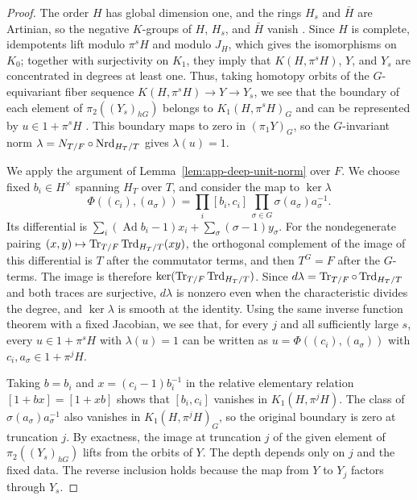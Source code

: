 \begin{proof}
The order $H$ has global dimension one, and the rings $H_s$ and $\bar H$ are Artinian, so the negative $K$-groups of $H$, $H_s$, and $\bar H$ vanish \cite[III, \S4 and Exercise 4.3]{WeibelKbook}.
Since $H$ is complete, idempotents lift modulo $\pi^sH$ and modulo $J_H$, which gives the isomorphisms on $K_0$; together with surjectivity on $K_1$, they imply that $K(H,\pi^sH)$, $Y$, and $Y_s$ are concentrated in degrees at least one.
Thus, taking homotopy orbits of the $G$-equivariant fiber sequence $K(H,\pi^sH)\to Y\to Y_s$, we see that the boundary of each element of $\pi_2((Y_s)_{hG})$ belongs to $K_1(H,\pi^sH)_G$ and can be represented by $u\in1+\pi^sH$ \cite[III, Lemma 2.4(1)]{WeibelKbook}.
This boundary maps to zero in $(\pi_1Y)_G$, so the $G$-invariant norm $\lambda=N_{T/F}\circ\operatorname{Nrd}_{H_T/T}$ gives $\lambda(u)=1$.

We apply the argument of Lemma~\ref{lem:app-deep-unit-norm} over $F$.
We choose fixed $b_i\in H^\times$ spanning $H_T$ over $T$, and consider the map to $\ker\lambda$
\[
 \Phi((c_i),(a_\sigma))=\prod_i[b_i,c_i]\,
                   \prod_{\sigma\in G}\sigma(a_\sigma)a_\sigma^{-1}.
\]
Its differential is $\sum_i(\operatorname{Ad}b_i-1)x_i+\sum_\sigma(\sigma-1)y_\sigma$.
For the nondegenerate pairing $(x,y)\mapsto\operatorname{Tr}_{T/F}\operatorname{Trd}_{H_T/T}(xy)$, the orthogonal complement of the image of this differential is $T$ after the commutator terms, and then $T^G=F$ after the $G$-terms.
The image is therefore $\ker(\operatorname{Tr}_{T/F}\operatorname{Trd}_{H_T/T})$.
Since $d\lambda=\operatorname{Tr}_{T/F}\circ\operatorname{Trd}_{H_T/T}$ and both traces are surjective, $d\lambda$ is nonzero even when the characteristic divides the degree, and $\ker\lambda$ is smooth at the identity.
Using the same inverse function theorem with a fixed Jacobian, we see that, for every $j$ and all sufficiently large $s$, every $u\in1+\pi^sH$ with $\lambda(u)=1$ can be written as $u=\Phi((c_i),(a_\sigma))$ with $c_i,a_\sigma\in1+\pi^jH$.

Taking $b=b_i$ and $x=(c_i-1)b_i^{-1}$ in the relative elementary relation $[1+bx]=[1+xb]$ \cite[III, Exercise 2.4]{WeibelKbook} shows that $[b_i,c_i]$ vanishes in $K_1(H,\pi^jH)$.
The class of $\sigma(a_\sigma)a_\sigma^{-1}$ also vanishes in $K_1(H,\pi^jH)_G$, so the original boundary is zero at truncation $j$.
By exactness, the image at truncation $j$ of the given element of $\pi_2((Y_s)_{hG})$ lifts from the orbits of $Y$.
The depth depends only on $j$ and the fixed data.
The reverse inclusion holds because the map from $Y$ to $Y_j$ factors through $Y_s$.


\end{proof}

